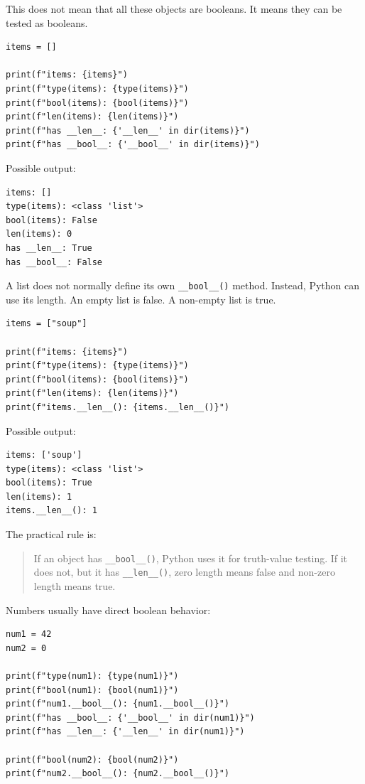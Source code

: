 This does not mean that all these objects are booleans. It means they can be tested as booleans.

\begin{verbatim}
items = []

print(f"items: {items}")
print(f"type(items): {type(items)}")
print(f"bool(items): {bool(items)}")
print(f"len(items): {len(items)}")
print(f"has __len__: {'__len__' in dir(items)}")
print(f"has __bool__: {'__bool__' in dir(items)}")
\end{verbatim}

Possible output:

\begin{verbatim}
items: []
type(items): <class 'list'>
bool(items): False
len(items): 0
has __len__: True
has __bool__: False
\end{verbatim}

A list does not normally define its own \texttt{\_\_bool\_\_()} method. Instead, Python can use its length. An empty list is false. A non-empty list is true.

\begin{verbatim}
items = ["soup"]

print(f"items: {items}")
print(f"type(items): {type(items)}")
print(f"bool(items): {bool(items)}")
print(f"len(items): {len(items)}")
print(f"items.__len__(): {items.__len__()}")
\end{verbatim}

Possible output:

\begin{verbatim}
items: ['soup']
type(items): <class 'list'>
bool(items): True
len(items): 1
items.__len__(): 1
\end{verbatim}

The practical rule is:

\begin{quote}
If an object has \texttt{\_\_bool\_\_()}, Python uses it for truth-value testing. If it does not, but it has \texttt{\_\_len\_\_()}, zero length means false and non-zero length means true.
\end{quote}

Numbers usually have direct boolean behavior:

\begin{verbatim}
num1 = 42
num2 = 0

print(f"type(num1): {type(num1)}")
print(f"bool(num1): {bool(num1)}")
print(f"num1.__bool__(): {num1.__bool__()}")
print(f"has __bool__: {'__bool__' in dir(num1)}")
print(f"has __len__: {'__len__' in dir(num1)}")

print(f"bool(num2): {bool(num2)}")
print(f"num2.__bool__(): {num2.__bool__()}")
\end{verbatim}

